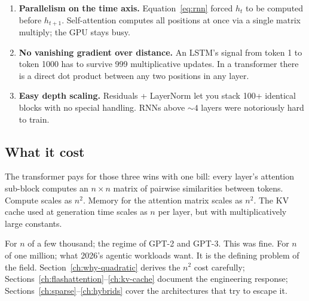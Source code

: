 \begin{enumerate}
\item \textbf{Parallelism on the time axis.} Equation~\eqref{eq:rnn} forced
\(h_t\) to be computed before \(h_{t+1}\). Self-attention computes all
positions at once via a single matrix multiply; the GPU stays busy.
\item \textbf{No vanishing gradient over distance.} An LSTM's signal from
token 1 to token 1000 has to survive 999 multiplicative updates. In a
transformer there is a direct dot product between any two positions in any
layer.
\item \textbf{Easy depth scaling.} Residuals + LayerNorm let you stack 100+
identical blocks with no special handling. RNNs above ${\sim}4$ layers were
notoriously hard to train.
\end{enumerate}

\subsection{What it cost}

The transformer pays for those three wins with one bill: every layer's
attention sub-block computes an \(n \times n\) matrix of pairwise
similarities between tokens. Compute scales as \(n^2\). Memory for the
attention matrix scales as \(n^2\). The KV cache used at generation time
scales as \(n\) per layer, but with multiplicatively large constants.

For \(n\) of a few thousand; the regime of GPT-2 and GPT-3. This was fine.
For \(n\) of one million; what 2026's agentic workloads want. It is the
defining problem of the field. Section~\ref{ch:why-quadratic} derives the
\(n^2\) cost carefully; Sections~\ref{ch:flashattention}--\ref{ch:kv-cache} document the engineering response;
Sections~\ref{ch:sparse}--\ref{ch:hybrids} cover the architectures that try to escape it.

